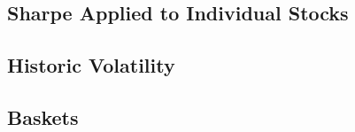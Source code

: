 \subsection{Sharpe Applied to Individual Stocks}


\subsection{Historic Volatility}


\subsection{Baskets}